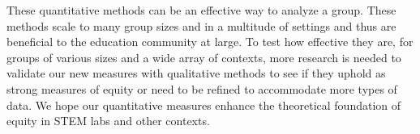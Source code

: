 \documentclass[aps,pra,reprint,noshowpacs,superscriptaddress, nofootinbib]{revtex4-1}
\begin{document}
These quantitative methods can be an effective way to analyze a group. These methods scale to many group sizes and in a multitude of settings and thus are beneficial to the education community at large. To test how effective they are, for groups of various sizes and a wide array of contexts, more research is needed to validate our new measures with qualitative methods to see if they uphold as strong measures of equity or need to be refined to accommodate more types of data. We hope our quantitative measures enhance the theoretical foundation of equity in STEM labs and other contexts.	
% 
% 





%
\end{document}
